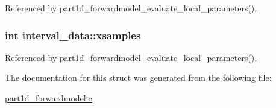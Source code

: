 Referenced by part1d\+\_\+forwardmodel\+\_\+evaluate\+\_\+local\+\_\+parameters().

\subsubsection[{\texorpdfstring{xsamples}{xsamples}}]{\setlength{\rightskip}{0pt plus 5cm}int interval\+\_\+data\+::xsamples}\hypertarget{structinterval__data_ac09bba53de396eb73698ce4f05622917}{}\label{structinterval__data_ac09bba53de396eb73698ce4f05622917}


Referenced by part1d\+\_\+forwardmodel\+\_\+evaluate\+\_\+local\+\_\+parameters().



The documentation for this struct was generated from the following file\+:\begin{DoxyCompactItemize}
\item 
\hyperlink{part1d__forwardmodel_8c}{part1d\+\_\+forwardmodel.\+c}\end{DoxyCompactItemize}
